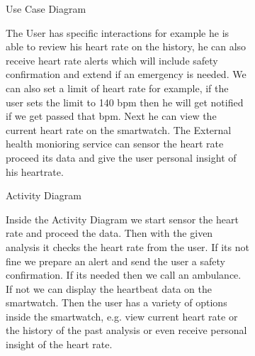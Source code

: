 \documentclass{article}
\begin{document}
	\begin{figure}[htbp]
		\centering
		\begin{subfigure}{\textwidth}
			\resizebox{\textwidth}{!}{}
			\caption{Use Case Diagram}
		\end{subfigure}
		\begin{subfigure}{\textwidth}
			The User has specific interactions for example he is able to review his heart rate on the history, he can also receive
			heart rate alerts which will include safety confirmation and extend if an emergency is needed. We can also set a limit of heart rate for example,
			if the user sets the limit to 140 bpm then he will get notified if we get passed that bpm. Next he can view the current heart rate on the smartwatch.
			The External health monioring service can sensor the heart rate proceed its data and give the user personal insight of his heartrate. 
		\end{subfigure}
	\end{figure}
	\newpage

	\begin{figure}[htbp]
		\centering
		\begin{subfigure}{\textwidth}
			\resizebox{\textwidth}{!}{}
			\caption{Activity Diagram}
		\end{subfigure}
		\begin{subfigure}{\textwidth}
			Inside the Activity Diagram we start sensor the heart rate and proceed the data. Then with the given analysis it checks the 
			heart rate from the user. If its not fine we prepare an alert and send the user a safety confirmation. If its needed then we call an ambulance. If not 
			we can display the heartbeat data on the smartwatch. Then the user has a variety of options inside the smartwatch, e.g. 
			view current heart rate or the history of the past analysis or even receive personal insight of the heart rate. 
		\end{subfigure}
	\end{figure}
	\newpage
\end{document}
